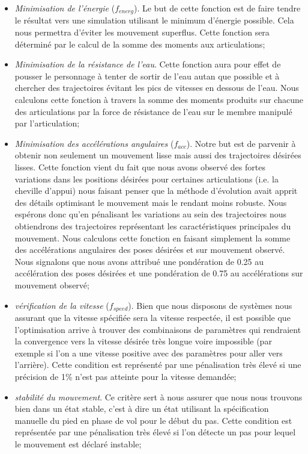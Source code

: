 \documentclass{llncs}
\begin{document}
\begin{itemize}
\item{\textit{Minimisation de l'énergie} ($f_{energ}$). Le but de cette fonction est de faire tendre le résultat vers une simulation utilisant le minimum d'énergie possible. Cela nous permettra d'éviter les mouvement superflus. Cette fonction sera déterminé par le calcul de la somme des moments aux articulations;}
\item{\textit{Minimisation de la résistance de l'eau}. Cette fonction aura pour effet de pousser le personnage à tenter de sortir de l'eau autan que possible et à chercher des trajectoires évitant les pics de vitesses en dessous de l'eau. Nous calculons cette fonction à travers la somme des moments produits sur chacune des articulations par la force de résistance de l'eau sur le membre manipulé par l'articulation; }
\item{\textit{Minimisation des accélérations angulaires} ($f_{acc}$). Notre but est de parvenir à obtenir non seulement un mouvement lisse mais aussi des trajectoires désirées lisses. Cette fonction vient du fait que nous avons observé des fortes variations dans les positions désirées pour certaines articulations (i.e. la cheville d'appui) nous faisant penser que la méthode d'évolution avait apprit des détails optimisant le mouvement mais le rendant moins robuste. Nous espérons donc qu'en pénalisant les variations au sein des trajectoires nous obtiendrons des trajectoires représentant les caractéristiques principales du mouvement. Nous calculons cette fonction en faisant simplement la somme des accélérations angulaires des poses désirées et sur mouvement observé. Nous signalons que nous avons attribué une pondération de 0.25 au accélération des poses désirées et une pondération de 0.75 au accélérations sur mouvement observé;}
\item{\textit{vérification de la vitesse} ($f_{speed}$). Bien que nous disposons de systèmes nous assurant que la vitesse spécifiée sera la vitesse respectée, il est possible que l'optimisation arrive à trouver des combinaisons de paramètres qui rendraient la convergence vers la vitesse désirée très longue voire impossible (par exemple si l'on a une vitesse positive avec des paramètres pour aller vers l'arrière). Cette condition est représenté par une pénalisation très élevé si une précision de 1\% n'est pas atteinte pour la vitesse demandée;}
\item{\textit{stabilité du mouvement}. Ce critère sert à nous assurer que nous nous trouvons bien dans un état stable, c'est à dire un état utilisant la spécification manuelle du pied en phase de vol pour le début du pas. Cette condition est représentée par une pénalisation très élevé si l'on détecte un pas pour lequel le mouvement est déclaré instable;  }

\end{itemize}
\end{document}
